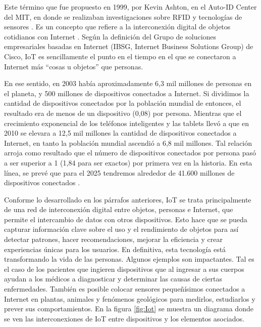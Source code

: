 Este término que fue propuesto en 1999, por Kevin Ashton, en el Auto-ID Center del MIT, en donde se realizaban investigaciones sobre RFID y tecnologías de sensores \citep{WEBSITE:IOTMIT}. Es un concepto que refiere a la interconexión digital de objetos cotidianos con Internet \citep{WEBSITE:IOTDefinicion}. Según la definición del Grupo de soluciones empresariales basadas en Internet (IBSG, Internet Business Solutions Group) de Cisco, IoT es sencillamente el punto en el tiempo en el que se conectaron a Internet más ``cosas u objetos'' que personas.

En ese sentido, en 2003 había aproximadamente 6,3 mil millones de personas en el planeta, y 500 millones de dispositivos conectados a Internet. Si dividimos la cantidad de dispositivos conectados por la población mundial de entonces, el resultado era de menos de un dispositivo (0,08) por persona. Mientras que el crecimiento exponencial de los teléfonos inteligentes y las tablets llevó a que en 2010 se elevara a 12,5 mil millones la cantidad de dispositivos conectados a Internet, en tanto la población mundial ascendió a 6,8 mil millones. Tal relación arroja como resultado que el número de dispositivos conectados por persona pasó a ser superior a 1 (1,84 para ser exactos) por primera vez en la historia. En esta línea, se prevé que para el 2025 tendremos alrededor de 41.600 millones de dispositivos conectados \citep{WEBSITE:IOTFechas}.

Conforme lo desarrollado en los párrafos anteriores, IoT se trata principalmente de una red de interconexión digital entre objetos, personas e Internet, que permite el intercambio de datos con otros dispositivos. Esto hace que se pueda capturar información clave sobre el uso y el rendimiento de objetos para así detectar patrones, hacer recomendaciones, mejorar la eficiencia y crear experiencias únicas para los usuarios. En definitiva, esta tecnología está transformando la vida de las personas. Algunos ejemplos son impactantes. Tal es el caso de los pacientes que ingieren dispositivos que
al ingresar a sus cuerpos ayudan a los médicos a diagnosticar y determinar las causas de ciertas enfermedades. También es posible colocar sensores pequeñísimos conectados a Internet en plantas, animales y fenómenos geológicos para medirlos, estudiarlos y prever sus comportamientos. En la figura \ref{fig:Iot} se muestra un diagrama donde se ven las interconexiones de IoT entre dispositivos y los elementos asociados.

